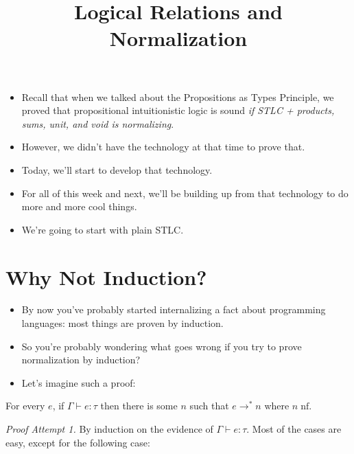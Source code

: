 \documentclass{lecturenotes}
\title{Logical Relations and Normalization}
\newcommand{\nf}[1]{#1\;\text{nf}}
\begin{document}
\maketitle

\begin{itemize}
\item Recall that when we talked about the Propositions as Types Principle, we proved that propositional intuitionistic logic is sound \emph{if STLC + products, sums, unit, and void is normalizing}.
\item However, we didn't have the technology at that time to prove that.
\item Today, we'll start to develop that technology.
\item For all of this week and next, we'll be building up from that technology to do more and more cool things.
\item We're going to start with plain STLC.
\end{itemize}

\section{Why Not Induction?}
\label{sec:why-not-induction}

\begin{itemize}
\item By now you've probably started internalizing a fact about programming languages: most things are proven by induction.
\item So you're probably wondering what goes wrong if you try to prove normalization by induction?
\item Let's imagine such a proof:
\end{itemize}

\begin{thm}[Normalization]
  For every $e$, if $\Gamma \vdash e : \tau$ then there is some $n$ such that $e \to^\ast n$ where $\nf{n}$.
\end{thm}
\noindent\textit{Proof Attempt 1.}\hspace{0.5em}
By induction on the evidence of $\Gamma \vdash e : \tau$.
Most of the cases are easy, except for the following case:
\end{document}
